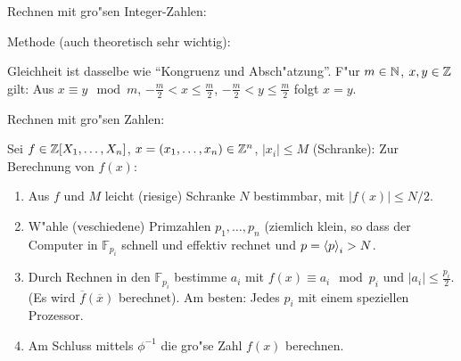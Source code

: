 \remark Rechnen mit gro"sen Integer-Zahlen:{
  Methode (auch theoretisch sehr wichtig):
  
  Gleichheit ist dasselbe wie ``Kongruenz und Absch"atzung''. F"ur
  $m\in\mathbb N$, $x,y\in\mathbb Z$ gilt: Aus $x\equiv y\mod m$, $-\frac m2<x\leq \frac m2$,
  $-\frac m2<y\leq \frac m2$ folgt $x=y$.
  }
\remark Rechnen mit gro"sen Zahlen:{
  Sei $f\in\mathbb Z[X_1,\ldots,X_n]$, $x=(x_1,\ldots,x_n)\in\mathbb Z^n$, $|x_i|\leq M$ (Schranke):
  Zur Berechnung von $f(x)$:
  \begin{enumerate}
    \item Aus $f$ und $M$ leicht (riesige) Schranke $N$ bestimmbar,
      mit $|f(x)|\leq N/2$.
    \item W"ahle (veschiedene) Primzahlen $p_1,\ldots,p_n$ (ziemlich klein,
      so dass der Computer in $\mathbb F_{p_i}$ schnell und effektiv
      rechnet und $p={\left\langle p\right\rangle}_i>N$.
    \item Durch Rechnen in den $\mathbb F_{p_i}$ bestimme $a_i$ mit
      $f(x)\equiv a_i\mod p_i$ und $|a_i|\leq \frac{ p_i}2$. (Es wird
      $\overline f(\overline x)$ berechnet). Am besten: Jedes $p_i$
      mit einem speziellen Prozessor.
    \item Am Schluss mittels $\phi^{-1}$ die gro"se Zahl $f(x)$ berechnen.
    \end{enumerate}
  }
  


